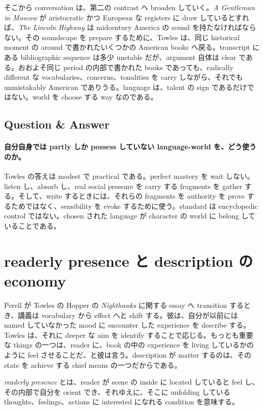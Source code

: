 そこから conversation は、第二の contrast へ broaden していく。\emph{A Gentleman in Moscow} が aristocratic かつ European な registers に draw しているとすれば、\emph{The Lincoln Highway} は midcentury America の sound を持たなければならない。その soundscape を prepare するために、Towles は、同じ historical moment の around で書かれたいくつかの American books へ戻る。transcript にある bibliographic sequence は多少 unstable だが、argument 自体は clear である。おおよそ同じ period の内部で書かれた books であっても、radically different な vocabularies、concerns、tonalities を carry しながら、それでも unmistakably American でありうる。language は、talent の sign であるだけではない。world を choose する way なのである。

\subsection{Question \& Answer}

\paragraph{自分自身では partly しか possess していない language-world を、どう使うのか。}

Towles の答えは modest で practical である。perfect mastery を wait しない。listen し、absorb し、real social pressure を carry する fragments を gather する。そして、write するときには、それらの fragments を authority を prove するためではなく、sensibility を evoke するために使う。standard は encyclopedic control ではない。chosen された language が character の world に belong していることである。

\section{readerly presence と description の economy}

Perell が Towles の Hopper の \emph{Nighthawks} に関する essay へ transition するとき、講義は vocabulary から effect へと shift する。彼は、自分が以前には named していなかった mood に encounter した experience を describe する。Towles は、それに deeper な aim を identify することで応じる。もっとも重要な things の一つは、reader に、book の中の experience を living しているかのように feel させることだ、と彼は言う。description が matter するのは、その state を achieve する chief means の一つだからである。

\begin{definition}
\emph{readerly presence} とは、reader が scene の inside に located していると feel し、その内部で自分を orient でき、それゆえに、そこに unfolding している thoughts、feelings、actions に interested になれる condition を意味する。
\end{definition}

